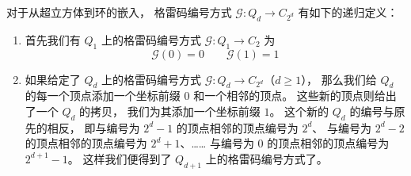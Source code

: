 对于从超立方体到环的嵌入，
格雷码编号方式 $\mathcal{G} \colon Q_d \rightarrow C_{2^d}$ 有如下的递归定义：
\begin{enumerate}[(1)]
	\item 首先我们有 $Q_1$ 上的格雷码编号方式
		$\mathcal{G} \colon Q_1 \rightarrow C_2$ 为
		\begin{equation*}
		\mathcal{G}(0) = 0 \qquad \mathcal{G}(1) = 1
		\end{equation*}
	\item 如果给定了 $Q_d$ 上的格雷码编号方式
		$\mathcal{G} \colon Q_d \rightarrow C_{2^d}$（$d \ge 1$），
		那么我们给 $Q_d$ 的每一个顶点添加一个坐标前缀 $0$ 和一个相邻的顶点。
		这些新的顶点则给出了一个 $Q_d$ 的拷贝，
		我们为其添加一个坐标前缀 $1$。
		这个新的 $Q_d$ 的编号与原先的相反，
		即与编号为 $2^d - 1$ 的顶点相邻的顶点编号为 $2^d$、
		与编号为 $2^d - 2$ 的顶点相邻的顶点编号为 $2^d + 1$、……
		与编号为 $0$ 的顶点相邻的顶点编号为 $2^{d + 1} - 1$。
		这样我们便得到了 $Q_{d + 1}$ 上的格雷码编号方式了。
\end{enumerate}

